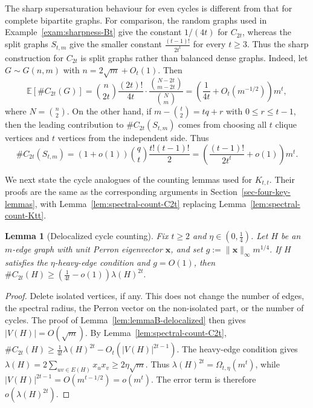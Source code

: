 \documentclass[11pt]{article}
\newtheorem{lemma}[theorem]{Lemma}
\theoremstyle{definition}
\theoremstyle{plain}
\begin{document}
The sharp supersaturation behaviour for even cycles is different from
that for complete bipartite graphs.  For comparison, the random graphs used in
Example~\ref{exam:sharpness-Bt} give the constant \(1/(4t)\) for
\(C_{2t}\), whereas the split graphs \(S_{t,m}\) give the smaller
constant $\frac{(t-1)!}{2t^t}$ for every \(t\ge3\).  Thus the sharp construction for \(C_{2t}\) is
split graphs rather than balanced dense graphs. Indeed, let \(G\sim G(n,m)\) with \(n=2\sqrt m+O_t(1)\).  Then
\[
 \mathbb E[\texttt{\#}C_{2t}(G)]
 =
 {n\choose 2t}\frac{(2t)!}{4t}
 \cdot
 \frac{\binom{N-2t}{m-2t}}{\binom{N}{m}}
 =
 \left(\frac{1}{4t}+O_t(m^{-1/2})\right)m^t,
\]
where \(N=\binom n2\).  On the other hand, if
\(m-\binom t2=tq+r\) with \(0\le r\le t-1\), then the leading
contribution to \(\texttt{\#}C_{2t}(S_{t,m})\) comes from choosing all
\(t\) clique vertices and \(t\) vertices from the independent side.
Thus
\[
        \texttt{\#}C_{2t}(S_{t,m})
        =
        \left(1+o(1)\right)
        {q\choose t}\frac{t!(t-1)!}{2}
        =
        \left(\frac{(t-1)!}{2t^t}+o(1)\right)m^t .
\]

We next state the cycle analogues of the counting lemmas used for
\(K_{t,t}\).  Their proofs are the same as the corresponding arguments
in Section~\ref{sec-four-key-lemmas}, with Lemma~\ref{lem:spectral-count-C2t}
replacing Lemma~\ref{lem:spectral-count-Ktt}.

\begin{lemma}[Delocalized cycle counting]
\label{lem:cycle-delocalized}
Fix \(t\ge2\) and \(\eta\in(0,\frac14)\).  Let \(H\) be an \(m\)-edge
graph with unit Perron eigenvector \(\bm{x}\), and set $g:=\|\bm{x}\|_\infty m^{1/4}.$
If \(H\) satisfies the \(\eta\)-heavy-edge condition and \(g=O(1)\), then $\texttt{\#}C_{2t}(H)
        \ge
        \left(\frac{1}{4t}-o(1)\right)\lambda(H)^{2t}.$
\end{lemma}

\begin{proof}
Delete isolated vertices, if any.  This does not change the number of
edges, the spectral radius, the Perron vector on the non-isolated part,
or the number of cycles.  The proof of Lemma~\ref{lem:lemmaB-delocalized}
then gives \(|V(H)|=O(\sqrt m)\).  By Lemma~\ref{lem:spectral-count-C2t},
$\texttt{\#}C_{2t}(H)
        \ge
        \frac{1}{4t}\lambda(H)^{2t}-O_t(|V(H)|^{2t-1}).$
The heavy-edge condition gives
$\lambda(H)
        =
        2\sum_{uv\in E(H)}x_ux_v
        \ge
        2\eta\sqrt m.$
Thus \(\lambda(H)^{2t}=\Omega_{t,\eta}(m^t)\), while $|V(H)|^{2t-1}=O(m^{t-1/2})=o(m^t).$
The error term is therefore \(o(\lambda(H)^{2t})\).
\end{proof}
\end{document}

